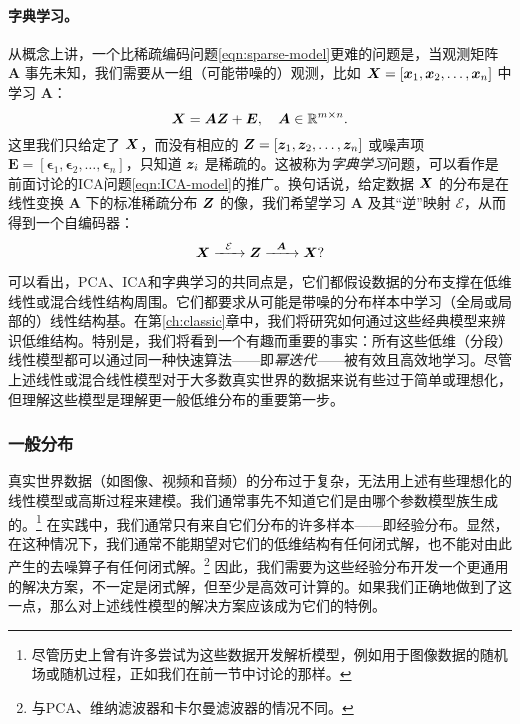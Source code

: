\documentclass[../../book-main_zh.tex]{subfiles}
\begin{document}
\paragraph{字典学习。}
从概念上讲，一个比稀疏编码问题\eqref{eqn:sparse-model}更难的问题是，当观测矩阵 $\boldsymbol{A}$ 事先未知，我们需要从一组（可能带噪的）观测，比如 $\bm{X} = [\bm{x}_1, \bm{x}_2, \ldots, \bm{x}_n]$ 中学习 $\boldsymbol{A}$：
\begin{equation}
    \bm{X} = \boldsymbol{A} \bm{Z} + \boldsymbol{E}, \quad \boldsymbol{A} \in \mathbb{R}^{m\times n}.
    \label{eqn:dictionary-learning}
\end{equation}
这里我们只给定了 $\bm{X}$，而没有相应的 $\bm{Z} = [\bm{z}_1, \bm{z}_2, \ldots, \bm{z}_n]$ 或噪声项 $\boldsymbol{E}= [\boldsymbol{\epsilon}_1, \boldsymbol{\epsilon}_2, \ldots, \boldsymbol{\epsilon}_n]$，只知道 $\bm{z}_i$ 是稀疏的。这被称为{\em 字典学习}问题，可以看作是前面讨论的ICA问题\eqref{eqn:ICA-model}的推广。换句话说，给定数据 $\bm{X}$ 的分布是在线性变换 $\boldsymbol{A}$ 下的标准稀疏分布 $\bm{Z}$ 的像，我们希望学习 $\boldsymbol{A}$ 及其“逆”映射 $\mathcal{E}$，从而得到一个自编码器：
\begin{equation}
    \bm{X}   \xrightarrow{\hspace{2mm} \mathcal{E} \hspace{2mm}}  \bm{Z} \xrightarrow{\hspace{2mm} \boldsymbol{A} \hspace{2mm}} \bm{X}?
       \label{eqn:decoding-DL}
\end{equation}

可以看出，PCA、ICA和字典学习的共同点是，它们都假设数据的分布支撑在低维线性或混合线性结构周围。它们都要求从可能是带噪的分布样本中学习（全局或局部的）线性结构基。在第\ref{ch:classic}章中，我们将研究如何通过这些经典模型来辨识低维结构。特别是，我们将看到一个有趣而重要的事实：所有这些低维（分段）线性模型都可以通过同一种快速算法——即{\em 幂迭代}\cite{Zhai-2020}——被有效且高效地学习。尽管上述线性或混合线性模型对于大多数真实世界的数据来说有些过于简单或理想化，但理解这些模型是理解更一般低维分布的重要第一步。

\subsubsection{一般分布}\label{sec:denoising-intro}

真实世界数据（如图像、视频和音频）的分布过于复杂，无法用上述有些理想化的线性模型或高斯过程来建模。我们通常事先不知道它们是由哪个参数模型族生成的。\footnote{尽管历史上曾有许多尝试为这些数据开发解析模型，例如用于图像数据的随机场或随机过程\cite{Mumford-1999}，正如我们在前一节中讨论的那样。} 在实践中，我们通常只有来自它们分布的许多样本——即经验分布。显然，在这种情况下，我们通常不能期望对它们的低维结构有任何闭式解，也不能对由此产生的去噪算子有任何闭式解。\footnote{与PCA、维纳滤波器和卡尔曼滤波器的情况不同。} 因此，我们需要为这些经验分布开发一个更通用的解决方案，不一定是闭式解，但至少是高效可计算的。如果我们正确地做到了这一点，那么对上述线性模型的解决方案应该成为它们的特例。
\end{document}
